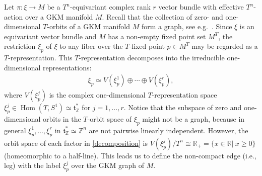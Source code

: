 \documentclass[12pt]{amsart}
\theoremstyle{definition}
\theoremstyle{remark}
\numberwithin{equation}{section}
\newcommand{\Ro}{{\mathbb{R}}}
\newcommand{\lb}{\lbrace}
\newcommand{\rb}{\rbrace}
\newcommand{\algt}{\mathfrak{t}}
\DeclareMathOperator{\Hm}{Hom}
\begin{document}
Let $\pi\colon \xi\to M$ be a $T^{n}$-equivariant complex rank $r$ vector bundle with effective $T^n$-action over a GKM manifold $M$.
Recall that the collection of zero- and one-dimensional $T$-orbits of a GKM manifold $M$ form a graph, see e.g.~\cite{GZ, Ku16}.
Since $\xi$ is an equivariant vector bundle and $M$ has a non-empty fixed point set $M^{T}$,
the restriction $\xi_{p}$ of $\xi$ to any fiber over the $T$-fixed point $p\in M^{T}$ may be regarded as a $T$-representation.
This $T$-representation decomposes into the irreducible one-dimensional representations:
\begin{align}
\label{decomposition}
\xi_{p}\simeq V(\xi_{p}^{1})\oplus \cdots \oplus V(\xi_{p}^{r}),
\end{align}
where $V(\xi_{p}^{j})$ is the complex one-dimensional $T$-representation space $\xi_{p}^{j}\in \Hm(T, S^{1})\simeq \algt_{\mathbb{Z}}^{*}$ for $j=1,\ldots, r$.
Notice that the subspace of zero and one-dimensional orbits in the $T$-orbit space of $\xi_{p}$ might not be a graph, because in general $\xi_{p}^{1},\ldots, \xi_{p}^{r}$ in $\algt^{*}_{\mathbb{Z}}\simeq \mathbb{Z}^{n}$ are not pairwise linearly independent.
However, the orbit space of each factor in \eqref{decomposition} is  $V(\xi_{p}^{j})/T^{n}\cong \Ro_{+}=\lb x\in \Ro |\ x\geq 0\rb$ (homeomorphic to a half-line).
This leads us to define the non-compact edge (i.e., leg) with the label $\xi_{p}^{j}$ over the GKM graph of $M$.
\end{document}
